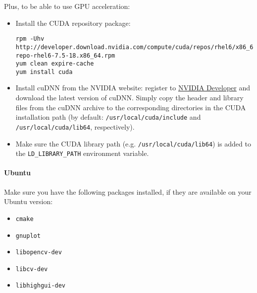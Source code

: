 \documentclass[a4paper,11pt,oneside]{article}
\newenvironment{myitemize}
{ \begin{itemize}
    \setlength{\itemsep}{0pt}
    \setlength{\parskip}{0pt}
    \setlength{\parsep}{0pt}     }
{ \end{itemize}                  }
\begin{document}
Plus, to be able to use GPU acceleration:
\begin{myitemize}
    \item Install the CUDA repository package:
\begin{lstlisting}
rpm -Uhv http://developer.download.nvidia.com/compute/cuda/repos/rhel6/x86_64/cuda-repo-rhel6-7.5-18.x86_64.rpm
yum clean expire-cache
yum install cuda
\end{lstlisting}
    \item Install cuDNN from the NVIDIA website: register to
    \href{https://developer.nvidia.com/cudnn}{NVIDIA Developer} and download
    the latest version of cuDNN.
    Simply copy the header and library files from the cuDNN archive to the
    corresponding directories in the CUDA installation path (by default:
     {\tt{}/usr/local/cuda/include} and {\tt{}/usr/local/cuda/lib64},
     respectively).
    \item Make sure the CUDA library path (e.g. {\tt{}/usr/local/cuda/lib64}) is
     added to the {\tt{}LD\_LIBRARY\_PATH} environment variable.
\end{myitemize}

\paragraph{Ubuntu}

Make sure you have the following packages installed, if they are available on
your Ubuntu version:
\begin{myitemize}
    \item \lstinline!cmake!
    \item \lstinline!gnuplot!
    \item \lstinline!libopencv-dev!
    \item \lstinline!libcv-dev!
    \item \lstinline!libhighgui-dev!
\end{myitemize}
\end{document}

